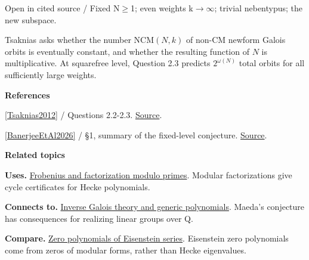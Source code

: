 \documentclass[11pt,a4paper,oneside,openany]{book}
\newenvironment{sources}{\par\smallskip\begingroup\footnotesize\color{atlasgray}\leftskip=10pt\setlength{\parskip}{2pt}}{\par\endgroup\smallskip}
\begin{document}
{\small\sffamily\color{atlasgold}Open in cited source / Fixed N\ensuremath{\ge}1; even weights k\ensuremath{\to}\ensuremath{\infty}; trivial nebentypus; the new subspace.}\par\smallskip
\color{black} Tsaknias asks whether the number \(\mathrm{NCM}(N,k)\) of non-CM newform Galois orbits is eventually constant, and whether the resulting function of \(N\) is multiplicative. At squarefree level, Question 2.3 predicts \(2^{\omega(N)}\) total orbits for all sufficiently large weights.\par
\begin{sources}
\textbf{References}\par\smallskip
\noindent\hyperlink{ref:Tsaknias2012}{[Tsaknias2012]} / Questions 2.2-2.3.  \href{https://link.springer.com/chapter/10.1007/978-3-319-03847-6_12}{Source}.\par
\noindent\hyperlink{ref:BanerjeeEtAl2026}{[BanerjeeEtAl2026]} / §1, summary of the fixed-level conjecture.  \href{https://arxiv.org/abs/2605.26771v2}{Source}.\par
\end{sources}\color{black}
\par\medskip\begingroup\footnotesize\setlength{\parskip}{1pt}\textbf{\sffamily\color{atlasgreen}Related topics}\par
\color{black}\textbf{Uses.} \hyperlink{article:frobenius}{Frobenius and factorization modulo primes}. Modular factorizations give cycle certificates for Hecke polynomials.\par
\color{black}\textbf{Connects to.} \hyperlink{article:inverse-galois}{Inverse Galois theory and generic polynomials}. Maeda's conjecture has consequences for realizing linear groups over Q.\par
\color{black}\textbf{Compare.} \hyperlink{article:eisenstein-zero-polynomials}{Zero polynomials of Eisenstein series}. Eisenstein zero polynomials come from zeros of modular forms, rather than Hecke eigenvalues.\par
\endgroup
\end{document}
